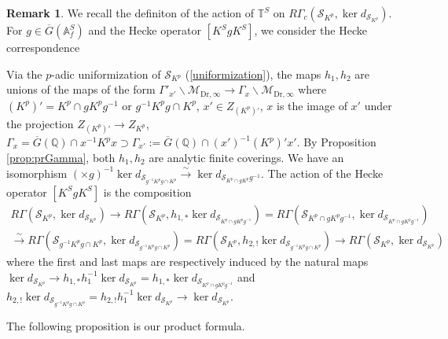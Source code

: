 \documentclass{article}
\theoremstyle{definition}
\newtheorem{remark}[theorem]{Remark}
\def\calM{\mathcal{M}}
\def\calS{\mathcal{S}}
\def\bbA{\mathbb{A}}
\def\bbQ{\mathbb{Q}}
\def\bbT{\mathbb{T}}
\def\bar{\overline}
\def\Dr{\mathrm{Dr}}
\begin{document}
\begin{remark}
    We recall the definiton of the action of $\bbT^S$ on $R\Gamma_c(\calS_{K^p},\ker d_{\calS_{K^p}})$. For $g\in \bar G(\bbA_f^S)$ and the Hecke operator $[K^SgK^S]$, we consider the Hecke correspondence 
    \begin{center}
    \end{center}
    Via the $p$-adic uniformization of $\calS_{K^p}$ (\ref{uniformization}), the maps $h_1,h_2$ are unions of the maps of the form $\Gamma'_{x'}\backslash\calM_{\Dr,\infty}\rightarrow \Gamma_x\backslash\calM_{\Dr,\infty}$ where $(K^p)'=K^p\cap gK^pg^{-1}$ or $g^{-1}K^pg\cap K^p$, $x'\in Z_{(K^p)'}$, $x$ is the image of $x'$ under the projection $Z_{(K^p)'}\rightarrow Z_{K^p}$, $\Gamma_x= \bar G (\bbQ)\cap x^{-1}K^px\supset \Gamma_{x'}:= \bar G (\bbQ)\cap (x')^{-1}(K^p)'x'$. By Proposition \ref{prop:prGamma}, both $h_1,h_2$ are analytic finite coverings. We have an isomorphism $(\times g)^{-1}\ker d_{\calS_{g^{-1}K^pg\cap K^p}}\stackrel{\sim}{\rightarrow} \ker d_{\calS_{K^p\cap gK^p}g^{-1}}$. The action of the Hecke operator $[K^SgK^S]$ is the composition
    \begin{align}\label{eq:HeckeonRGammakerdS}
    R\Gamma(\calS_{K^p},\ker d_{\calS_{K^p}})\stackrel{}{\rightarrow} R\Gamma(\calS_{K^p},h_{1,*}\ker d_{\calS_{K^p\cap gK^pg^{-1}}})=R\Gamma(\calS_{K^p\cap gK^pg^{-1}},\ker d_{\calS_{K^p\cap gK^pg^{-1}}})\nonumber \\
    \stackrel{\sim}{\rightarrow} R\Gamma(\calS_{g^{-1}K^pg\cap K^p},\ker d_{\calS_{g^{-1}K^pg\cap K^p}})=R\Gamma(\calS_{K^p},h_{2,!}\ker d_{\calS_{g^{-1}K^pg\cap K^p}})\rightarrow R\Gamma(\calS_{K^p},\ker d_{\calS_{K^p}})
    \end{align}
    where the first and last maps are respectively induced by the natural maps $\ker d_{\calS_{K^p}}\rightarrow h_{1,*}h_1^{-1}\ker d_{\calS_{K^p}}=h_{1,*}\ker d_{\calS_{ K^p\cap gK^pg^{-1}}}$ and $h_{2,!}\ker d_{\calS_{g^{-1}K^pg\cap K^p}}=h_{2,!}h_1^{-1}\ker d_{\calS_{K^p}}\rightarrow \ker d_{\calS_{K^p}}$.
\end{remark}
The following proposition is our product formula. 
\end{document}
